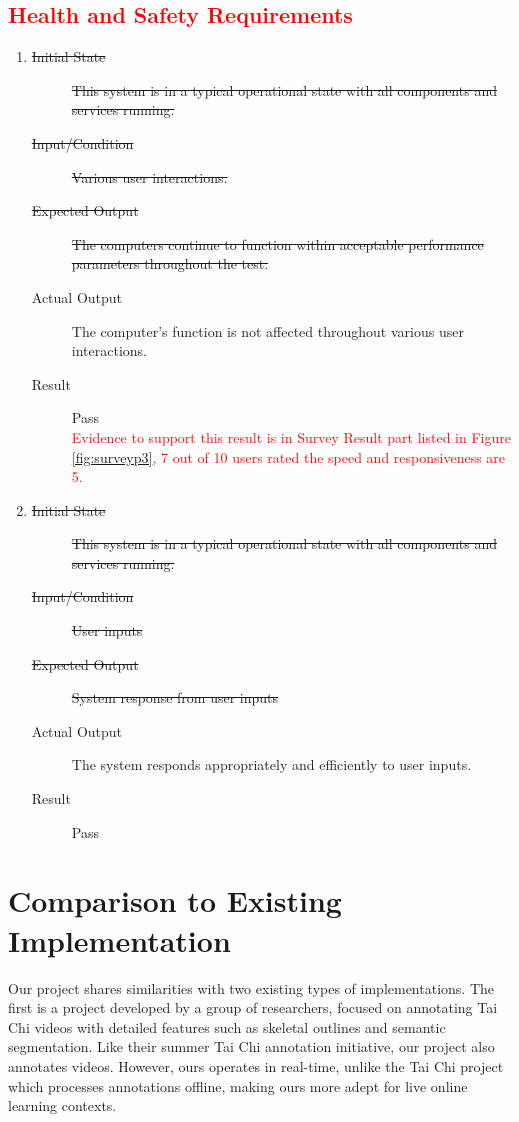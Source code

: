 \documentclass[12pt, titlepage]{article}
\newcommand{\rt}[1]{\textcolor{red}{#1}}
\begin{document}
\rt{\subsection{Health and Safety Requirements}}
\begin{enumerate}
\item \label{NFRT29}
  \begin{description}
  \item[\sout{Initial State}] \sout{This system is in a typical operational
      state with all components and services running.}
  \item[\sout{Input/Condition}] \sout{Various user interactions.}
  \item[\sout{Expected Output}] \sout{The computers continue to function within
      acceptable performance parameters throughout the test.}
  \item[Actual Output] The computer's function is not affected throughout various
    user interactions.
  \item[Result] Pass \\
    \rt{Evidence to support this result is in Survey Result part listed in Figure \ref{fig:surveyp3},
      7 out of 10 users rated the speed and responsiveness are 5.}
  \end{description}
\item \label{NFRT30}
  \begin{description}
  \item[\sout{Initial State}] \sout{This system is in a typical operational
      state with all components and services running.}
  \item[\sout{Input/Condition}] \sout{User inputs}
  \item[\sout{Expected Output}] \sout{System response from user inputs}
  \item[Actual Output] The system responds appropriately and efficiently to user
    inputs.
  \item[Result] Pass
  \end{description}
\end{enumerate}

\section{Comparison to Existing Implementation}

Our project shares similarities with two existing types of implementations. The
first is a project developed by a group of researchers, focused on annotating
Tai Chi videos with detailed features such as skeletal outlines and semantic
segmentation. Like their summer Tai Chi annotation initiative, our project also
annotates videos. However, ours operates in real-time, unlike the Tai Chi
project which processes annotations offline, making ours more adept for live
online learning contexts.
\end{document}
